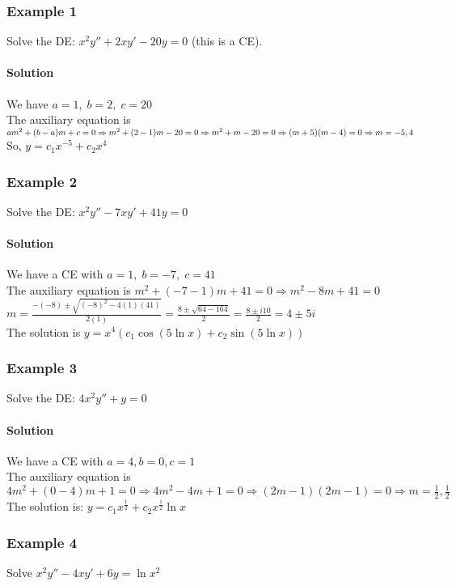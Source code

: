 \documentclass{article}
\begin{document}
\subsubsection{Example 1}
Solve the DE: $x^2y''+2xy'-20y=0$ (this is a CE).
\paragraph{Solution} We have $a=1,\;b=2,\;c=20$
\\The auxiliary equation is $am^2+(b-a)m+c=0\Rightarrow m^2+(2-1)m-20=0\Rightarrow m^2+m-20=0
\\\Rightarrow(m+5)(m-4)=0\Rightarrow m=-5,4$
\\So, $y=c_1x^{-5}+c_2x^4$

\newpage\subsubsection{Example 2}
Solve the DE: $x^2y''-7xy'+41y=0$
\paragraph{Solution} We have a CE with $a=1,\;b=-7,\;c=41$
\\The auxiliary equation is $m^2+(-7-1)m+41=0\Rightarrow m^2-8m+41=0$
\\$m=\frac{-(-8)\pm\sqrt{(-8)^2-4(1)(41)}}{2(1)}=\frac{8\pm\sqrt{64-164}}{2}=\frac{8\pm i10}{2}=4\pm 5i$
\\The solution is $y=x^4(c_1\cos(5\ln x)+c_2\sin(5\ln x))$

\subsubsection{Example 3}
Solve the DE: $4x^2y''+y=0$
\paragraph{Solution} We have a CE with $a=4,b=0,c=1$
\\The auxiliary equation is $4m^2+(0-4)m+1=0\Rightarrow 4m^2-4m+1=0\Rightarrow(2m-1)(2m-1)=0\Rightarrow m=\frac{1}{2},\frac{1}{2}$
\\The solution is: $y=c_1x^{\frac{1}{2}}+c_2x^{\frac{1}{2}}\ln x$

\subsubsection{Example 4}
Solve $x^2y''-4xy'+6y=\ln x^2$
\end{document}
